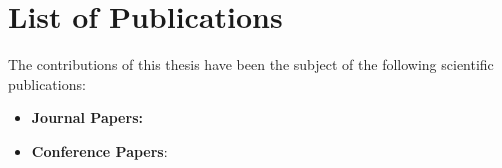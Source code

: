 
\chapter*{List of Publications}
\vspace{-2 em}
The contributions of this thesis have been the subject of the following scientific publications:
\begin{itemize}
    \item \textbf{Journal Papers:}
    
    
    
    \item \textbf{Conference Papers}:
    
   
    
\end{itemize}
\clearpage

